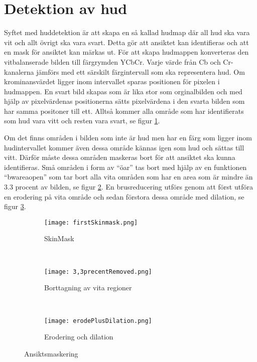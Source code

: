 \documentclass[a4paper,12pt,oneside,final]{extbook}
\begin{document}
\section{Detektion av hud}
Syftet med huddetektion är att skapa en så kallad hudmap där all hud ska vara vit och allt övrigt ska vara svart. Detta gör att ansiktet kan identifieras och att en mask för ansiktet kan märkas ut. För att skapa hudmappen konverteras den vitbalanserade bilden till färgrymden YCbCr. Varje värde från Cb och Cr-kanalerna jämförs med ett särskilt färgintervall som ska representera hud. Om krominansvärdet ligger inom intervallet sparas positionen för pixelen i hudmappen. En svart bild skapas som är lika stor som orginalbilden och med hjälp av pixelvärdenas positionerna sätts pixelvärdena i den svarta bilden som har samma positoner till ett. Alltså kommer alla område som har identifierats som hud vara vitt och resten vara svart, se figur \ref{fig:firstSkinmask}.

Om det finns områden i bilden som inte är hud men har en färg som ligger inom hudintervallet kommer även dessa område kännas igen som hud och sättas till vitt. Därför måste dessa områden maskeras bort för att ansiktet ska kunna identifieras. Små områden i form av “öar” tas bort med hjälp av en funktionen “bwareaopen” som tar bort alla vita områden som har en area som är mindre än 3.3 procent av bilden, se figur \ref{fig:3,3precentRemoved}. En brusreducering utförs genom att först utföra en erodering på vita område och sedan förstora dessa område med dilation, se figur \ref{fig:erodePlusDilation}.


\begin{figure}[h]
    \centering
    \begin{subfigure}[b]{0.3\textwidth}
        \texttt{[image: firstSkinmask.png]}
        \caption{SkinMask}
        \label{fig:firstSkinmask}
    \end{subfigure}
    ~ %
    \begin{subfigure}[b]{0.3\textwidth}
        \texttt{[image: 3,3precentRemoved.png]}
        \caption{Borttagning av vita regioner}
        \label{fig:3,3precentRemoved}
    \end{subfigure}
    ~ %
    \begin{subfigure}[b]{0.3\textwidth}
        \texttt{[image: erodePlusDilation.png]}
        \caption{Erodering och dilation}
        \label{fig:erodePlusDilation}
    \end{subfigure}
    \caption{Ansiktsmaskering}\label{fig:binaryImages}
\end{figure}
\end{document}
